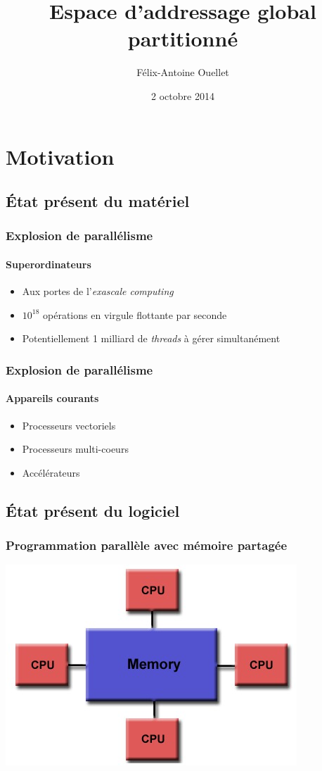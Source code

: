 \documentclass{beamer}
\author[Félix-Antoine Ouellet]{Félix-Antoine Ouellet}
\title[PGAS\hspace{2em}\insertframenumber/\inserttotalframenumber]{Espace d'addressage global partitionné}
\institute{Université de Sherbrooke}
\date{2 octobre 2014}
\begin{document}
\begin{frame}
\titlepage %
\end{frame}

\section{Motivation}
\subsection{État présent du matériel}
\begin{frame}
\frametitle{Explosion de parallélisme}
\framesubtitle{Superordinateurs}
\begin{itemize}
\item Aux portes de l'\textit{exascale computing}
\item $10^{18}$ opérations en virgule flottante par seconde
\item Potentiellement 1 milliard de \textit{threads} à gérer simultanément
\end{itemize}
\end{frame}

\begin{frame}
\frametitle{Explosion de parallélisme}
\framesubtitle{Appareils courants}
\begin{itemize}
\item Processeurs vectoriels
\item Processeurs multi-coeurs
\item Accélérateurs
\end{itemize}
\end{frame}

\subsection{État présent du logiciel}
\begin{frame}
\frametitle{Programmation parallèle avec mémoire partagée}
\begin{center}
\includegraphics[scale=0.6]{sharedmem.jpg}
\end{center}
\end{frame}
\end{document}
